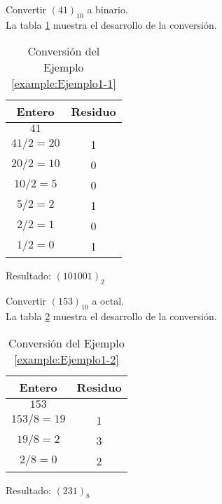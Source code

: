\begin{exampleT}{\rm
    Convertir $(41)_{10}$ a binario.\\
    La tabla \ref{table:Ejemplo1-1} muestra el desarrollo de la conversión.\\
    
   \begin{table}[!h]
   	\centering
	\begin{tabular}{c c}
	  \toprule
	    \textbf{Entero} & \textbf{Residuo} \\
	    \midrule
	    $41$ 	& \\
	    $41/2=20$	& 1\\
	    $20/2=10$	& 0\\
	    $10/2=5$	& 0\\
	    $5/2=2$	& 1\\
	    $2/2=1$	& 0\\
	    $1/2=0$	& 1\\
	  \bottomrule
	\end{tabular}
	\caption{Conversión del Ejemplo \ref{example:Ejemplo1-1}}
	\label{table:Ejemplo1-1}
   \end{table}

  Resultado: $(101001)_{2}$
  \label{example:Ejemplo1-1}
}\end{exampleT}
  

\begin{exampleT}{\rm
    Convertir $(153)_{10}$ a octal.\\
    La tabla \ref{table:Ejemplo1-2} muestra el desarrollo de la conversión.\\
    
    \begin{table}[!h]
    \centering
	\begin{tabular}{c c}
	  \toprule
	    \textbf{Entero} & \textbf{Residuo} \\
	    \midrule
	    $153$ 	& \\
	    $153/8=19$	& 1\\
	    $19/8=2$ 	& 3\\
	    $2/8=0$	& 2\\
	  \bottomrule
	\end{tabular}
	\caption{Conversión del Ejemplo \ref{example:Ejemplo1-2}}
	\label{table:Ejemplo1-2}
    \end{table}

  Resultado: $(231)_{8}$
  \label{example:Ejemplo1-2}
}\end{exampleT}

